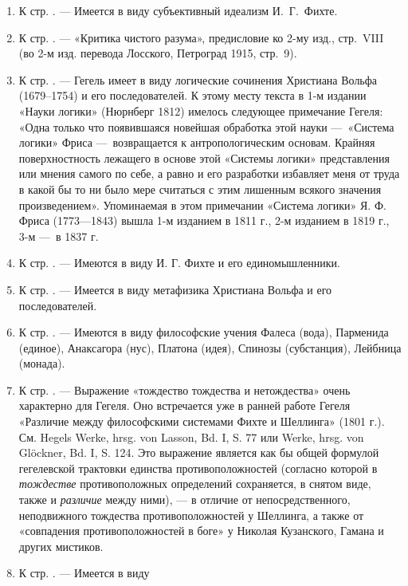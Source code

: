 \begin{enumerate}
\item \label{bkm:Ref474656390}К стр. \pageref{bkm:bm10}. — Имеется в виду
субъективный идеализм И.~Г.~Фихте.
\item \label{bkm:Ref474656395}К стр. \pageref{bkm:bm11}. — «Критика чистого
разума», предисловие ко 2-му изд., стр.~VIII (во 2-м изд. перевода
Лосского, Петроград 1915, стр.~9).
\item \label{bkm:Ref474656429}К стр. \pageref{bkm:bm12}. — Гегель имеет в
виду логические сочинения Христиана Вольфа (1679–1754) и его
последователей. К этому месту текста в 1-м издании «Науки логики» (Нюрнберг
1812) имелось следующее примечание Гегеля: «Одна только что появившаяся
новейшая обработка этой науки —~«Система логики» Фриса —~возвращается к
антропологическим основам. Крайняя поверхностность лежащего в основе этой
«Системы логики» представления или мнения самого по себе, а равно и его
разработки избавляет меня от труда в какой бы то ни было мере считаться с
этим лишенным всякого значения произведением». Упоминаемая в этом
примечании «Система логики» Я. Ф. Фриса (1773—1843) вышла 1-м изданием в
1811 г., 2-м изданием в 1819 г., 3-м —~в 1837 г.
\item \label{bkm:Ref474656465}К стр. \pageref{bkm:bm13}. — Имеются в виду И.
Г. Фихте и его единомышленники.
\item \label{bkm:Ref474656486}К стр. \pageref{bkm:bm14}. — Имеется в виду
метафизика Христиана Вольфа и его последователей.
\item \label{bkm:Ref474656514}К стр. \pageref{bkm:bm15}. — Имеются в виду
философские учения Фалеса (вода), Парменида (единое), Анаксагора (нус),
Платона (идея), Спинозы (субстанция), Лейбница (монада).
\item \label{bkm:Ref474656532}К стр. \pageref{bkm:bm16}. — Выражение
«тождество тождества и нетождества» очень характерно для Гегеля. Оно
встречается уже в ранней работе Гегеля «Различие между философскими
системами Фихте и Шеллинга» (1801 г.). См. Hegels Werke, hrsg. von Lasson,
Bd. I, S. 77 или Werke, hrsg. von Glöckner, Bd. I, S. 124. Это выражение
является как бы общей формулой гегелевской трактовки единства
противоположностей (согласно которой в {\em тождестве} противоположных
определений сохраняется, в снятом виде, также и {\em различие} между
ними), — в отличие от непосредственного, неподвижного тождества
противоположностей у Шеллинга, а также от «совпадения противоположностей в
боге» у Николая Кузанского, Гамана и других мистиков.
\item \label{bkm:Ref474656544}К стр. \pageref{bkm:bm17}. — Имеется в виду

\end{enumerate}
